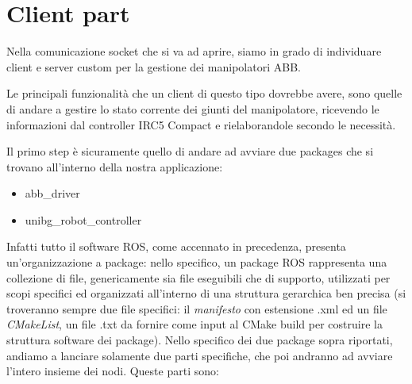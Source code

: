 \section{Client part}
\label{sec:Client}
Nella comunicazione socket che si va ad aprire, siamo in grado di individuare client e server custom per la gestione dei manipolatori ABB.

Le principali funzionalità che un client di questo tipo dovrebbe avere, sono quelle di andare a gestire lo stato corrente dei giunti del manipolatore, ricevendo le informazioni dal controller IRC5 Compact e rielaborandole secondo le necessità.

Il primo step è sicuramente quello di andare ad avviare due packages che si trovano all'interno della nostra applicazione:
\begin{itemize}
	\item abb\_driver
	\item unibg\_robot\_controller
\end{itemize}
Infatti tutto il software ROS, come accennato in precedenza, presenta un'organizzazione a package: nello specifico, un package ROS rappresenta una collezione di file, genericamente sia file eseguibili che di supporto, utilizzati per scopi specifici ed organizzati all'interno di una struttura gerarchica ben precisa (si troveranno sempre due file specifici: il \emph{manifesto} con estensione .xml ed un file \emph{CMakeList}, un file .txt da fornire come input al CMake build per costruire la struttura software dei package).
Nello specifico dei due package sopra riportati, andiamo a lanciare solamente due parti specifiche, che poi andranno ad avviare l'intero insieme dei nodi. Queste parti sono:
